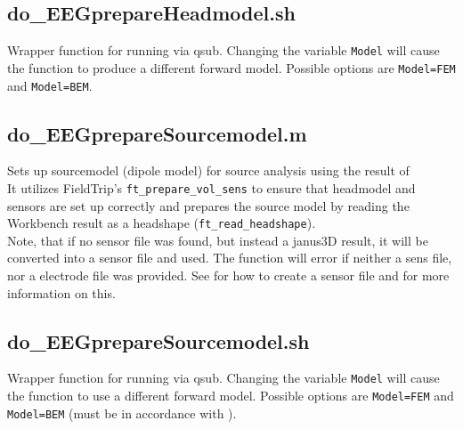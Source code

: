 \documentclass[12pt,a4paper]{scrartcl}
\begin{document}
\subsection{do\_EEGprepareHeadmodel.sh}
\label{sh:prepHM}
Wrapper function for running \texttt{} via qsub. Changing the variable \texttt{Model} will cause the function to produce a different forward model. Possible options are \texttt{Model=FEM} and \texttt{Model=BEM}.\\

\subsection{do\_EEGprepareSourcemodel.m}
\label{m:prepSM}
Sets up sourcemodel (dipole model) for source analysis using the result of \texttt{}\\
\noindent It utilizes FieldTrip's \texttt{ft\_prepare\_vol\_sens} to ensure that headmodel and sensors are set up correctly and prepares the source model by reading the Workbench result as a headshape (\texttt{ft\_read\_headshape}).\\

\noindent Note, that if no sensor file was found, but instead a janus3D result, it will be converted into a sensor file and used. The function will error if neither a sens file, nor a electrode file was provided. See  for how to create a sensor file and  for more information on this.

\subsection{do\_EEGprepareSourcemodel.sh}
\label{sh:prepSM}
Wrapper function for running \texttt{} via qsub. Changing the variable \texttt{Model} will cause the function to use a different forward model. Possible options are \texttt{Model=FEM} and \texttt{Model=BEM} (must be in accordance with \texttt{}).\\
\end{document}
